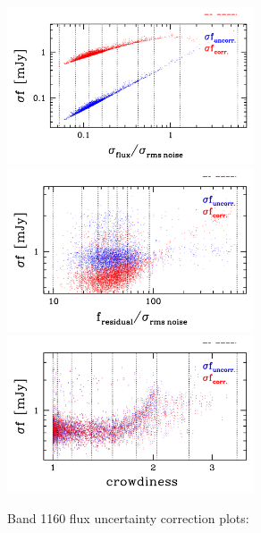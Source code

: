 \documentclass[11pt,a4paper]{article}
\begin{document}
\begin{figure}[H]
	\caption{
		Band 1160 flux uncertainty correction plots:
	}
	\includegraphics[width=0.65\textwidth]{galsim_1160_dfcorr_1}
	\includegraphics[width=0.65\textwidth]{galsim_1160_dfcorr_2}
	\includegraphics[width=0.65\textwidth]{galsim_1160_dfcorr_3}
\end{figure}
\end{document}
